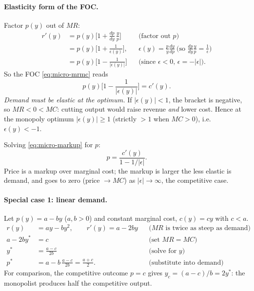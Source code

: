 \paragraph{Elasticity form of the FOC.} Factor $p(y)$ out of $MR$:
\begin{align*}
r'(y)&=p(y)\Big[1+\frac{dp}{dy}\,\frac{y}{p}\Big] &&\text{(factor out $p$)}\\
&=p(y)\Big[1+\frac{1}{\epsilon(y)}\Big], &&\epsilon(y)=\frac{p}{y}\frac{dy}{dp}\ \text{(so }\tfrac{dp}{dy}\tfrac{y}{p}=\tfrac{1}{\epsilon}\text{)}\\
&=p(y)\Big[1-\frac{1}{|\epsilon(y)|}\Big] &&\text{(since $\epsilon<0$, $\epsilon=-|\epsilon|$).}
\end{align*}
So the FOC \eqref{eq:micro-mrmc} reads
\begin{equation}\label{eq:micro-markup}
p(y)\Big[1-\frac{1}{|\epsilon(y)|}\Big]=c'(y).
\end{equation}
\emph{Demand must be elastic at the optimum.} If $|\epsilon(y)|<1$, the bracket is negative, so $MR<0<MC$: cutting output would raise revenue \emph{and} lower cost. Hence at the monopoly optimum $|\epsilon(y)|\ge 1$ (strictly $>1$ when $MC>0$), i.e.\ $\epsilon(y)<-1$.

\begin{keybox}[title=Monopoly markup rule]
Solving \eqref{eq:micro-markup} for $p$:
\[
p=\frac{c'(y)}{1-1/|\epsilon|}.
\]
Price is a markup over marginal cost; the markup is larger the less elastic is demand, and goes to zero (price $\to MC$) as $|\epsilon|\to\infty$, the competitive case.
\end{keybox}

\paragraph{Special case 1: linear demand.} Let $p(y)=a-by$ ($a,b>0$) and constant marginal cost, $c(y)=cy$ with $c<a$.
\begin{align*}
r(y)&=ay-by^2,\qquad r'(y)=a-2by &&\text{($MR$ is twice as steep as demand)}\\
a-2by^*&=c &&\text{(set $MR=MC$)}\\
y^*&=\frac{a-c}{2b} &&\text{(solve for $y$)}\\
p^*&=a-b\,\frac{a-c}{2b}=\frac{a+c}{2}. &&\text{(substitute into demand)}
\end{align*}
For comparison, the competitive outcome $p=c$ gives $y_c=(a-c)/b=2y^*$: the monopolist produces half the competitive output.

